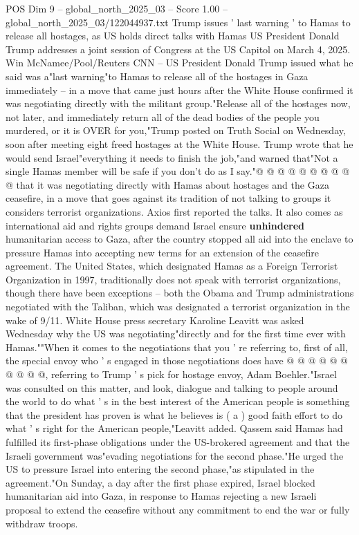 \begin{textsample}{POS Dim 9 – global\_north\_2025\_03 – Score 1.00 – global\_north\_2025\_03/122044937.txt}  \label{ex:f9_pos_389}
Trump issues ' last warning ' to Hamas to release all hostages, as US holds direct talks with Hamas US President Donald Trump addresses a joint session of Congress at the US Capitol on March 4, 2025.
Win McNamee/Pool/Reuters CNN -- US President Donald Trump issued what he said was a"last warning"to Hamas to release all of the hostages in Gaza immediately -- in a move that came just hours after the White House confirmed it was negotiating directly with the militant group."Release all of the hostages now, not later, and immediately return all of the dead bodies of the people you murdered, or it is OVER for you,"Trump posted on Truth Social on Wednesday, soon after meeting eight freed hostages at the White House.
Trump wrote that he would send Israel"everything it needs to finish the job,"and warned that"Not a single Hamas member will be safe if you don't do as I say."@ @ @ @ @ @ @ @ @ @ that it was negotiating directly with Hamas about hostages and the Gaza ceasefire, in a move that goes against its tradition of not talking to groups it considers terrorist organizations.
Axios first reported the talks.
It also comes as international aid and rights groups demand Israel ensure \textbf{unhindered} humanitarian access to Gaza, after the country stopped all aid into the enclave to pressure Hamas into accepting new terms for an extension of the ceasefire agreement.
The United States, which designated Hamas as a Foreign Terrorist Organization in 1997, traditionally does not speak with terrorist organizations, though there have been exceptions -- both the Obama and Trump administrations negotiated with the Taliban, which was designated a terrorist organization in the wake of 9/11.
White House press secretary Karoline Leavitt was asked Wednesday why the US was negotiating"directly and for the first time ever with Hamas.""When it comes to the negotiations that you ' re referring to, first of all, the special envoy who ' s engaged in those negotiations does have @ @ @ @ @ @ @ @ @ @, referring to Trump ' s pick for hostage envoy, Adam Boehler."Israel was consulted on this matter, and look, dialogue and talking to people around the world to do what ' s in the best interest of the American people is something that the president has proven is what he believes is ( a ) good faith effort to do what ' s right for the American people,"Leavitt added.
Qassem said Hamas had fulfilled its first-phase obligations under the US-brokered agreement and that the Israeli government was"evading negotiations for the second phase."He urged the US to pressure Israel into entering the second phase,"as stipulated in the agreement."On Sunday, a day after the first phase expired, Israel blocked humanitarian aid into Gaza, in response to Hamas rejecting a new Israeli proposal to extend the ceasefire without any commitment to end the war or fully withdraw troops.

\end{textsample}
